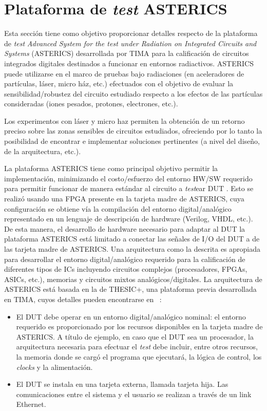 \documentclass[a4paper,openright,12pt]{report}
\begin{document}
\section{Plataforma de \textit{test} ASTERICS}
Esta sección tiene como objetivo proporcionar detalles respecto  de la plataforma de \textit{test} \textit{Advanced System for the \textit{test} under Radiation on Integrated Circuits and Systems} (ASTERICS)  desarrollada por TIMA para la calificación de circuitos integrados digitales destinados a funcionar en entornos radiactivos. 
ASTERICS puede utilizarse en el marco de pruebas bajo radiaciones (en aceleradores de partículas, láser, micro ház, etc.) efectuados con el objetivo de evaluar la sensibilidad/robustez del circuito estudiado respecto a los efectos de las partículas consideradas (iones pesados, protones, electrones, etc.).

Los experimentos con láser y micro haz permiten la obtención de un retorno preciso sobre las zonas sensibles de circuitos estudiados, ofreciendo por lo tanto la posibilidad de encontrar e implementar soluciones pertinentes (a nivel del diseño, de la arquitectura, etc.). 


La plataforma ASTERICS tiene como principal objetivo permitir la implementación, minimizando el costo/esfuerzo del entorno HW/SW requerido para permitir funcionar de manera estándar al circuito a \textit{test}ear DUT . Esto se realizó usando una FPGA presente en la tarjeta madre de ASTERICS,  cuya configuración se obtiene vía la compilación del entorno digital/analógico representado en un lenguaje de descripción de hardware (Verilog, VHDL, etc.). De esta manera, el desarrollo de hardware necesario para adaptar al DUT la plataforma ASTERICS está limitado a conectar las señales de  I/O  del DUT a de las tarjeta madre de ASTERICS. Una  arquitectura como la descrita  es apropiada para desarrollar el entorno digital/analógico requerido para la calificación de diferentes tipos de ICs incluyendo circuitos complejos (procesadores, FPGAs, ASICs, etc.), memorias y circuitos mixtos analógicos/digitales.
La arquitectura de ASTERICS está basada en la de THESIC+, una plataforma previa desarrollada en TIMA, cuyos detalles pueden encontrarse en  ~\cite{faure2002thesic+}:  
\begin{itemize}
\item	El DUT debe operar en un entorno digital/analógico nominal: el entorno requerido es proporcionado por los recursos disponibles en la tarjeta madre de ASTERICS. A título de ejemplo, en caso que el DUT sea un procesador, la arquitectura necesaria para efectuar el \textit{test} debe incluir, entre otros recursos, la memoria donde se cargó el programa que ejecutará, la lógica de control, los \textit{clocks} y la alimentación.
\item	El DUT se instala en una tarjeta externa, llamada tarjeta hija. Las comunicaciones entre el sistema y el usuario se realizan a través de un link Ethernet.

\end{itemize}
\end{document}
